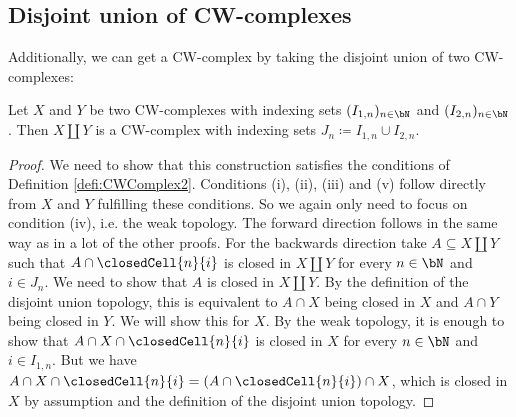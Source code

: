 \subsection{Disjoint union of CW-complexes}

Additionally, we can get a CW-complex by taking the disjoint union of two CW-complexes: 

\begin{lem}
    Let $X$ and $Y$ be two CW-complexes with indexing sets $(I_{1,n})_{n \in \bN}$ and $(I_{2, n})_{n \in \bN}$. 
    Then $X \amalg Y$ is a CW-complex with indexing sets $J_n \coloneq I_{1, n} \cup I_{2, n}$. \href{https://github.com/scholzhannah/CWComplexes/blob/7be4872a05b534011cc969eb5b80a4b7f0bf57e2/CWcomplexes/Constructions.lean#L71-L136}{\faExternalLink}
\end{lem}
\begin{proof}
    We need to show that this construction satisfies the conditions of Definition \ref{defi:CWComplex2}. 
    Conditions (i), (ii), (iii) and (v) follow directly from $X$ and $Y$ fulfilling these conditions. 
    So we again only need to focus on condition (iv), i.e. the weak topology. 
    The forward direction follows in the same way as in a lot of the other proofs.
    For the backwards direction take $A \subseteq X \amalg Y$ such that $A \cap \closedCell{n}{i}$ is closed in $X \amalg Y$ for every $n \in \bN$ and $i \in J_n$. 
    We need to show that $A$ is closed in $X \amalg Y$. 
    By the definition of the disjoint union topology, this is equivalent to $A \cap X$ being closed in $X$ and $A \cap Y$ being closed in $Y$. 
    We will show this for $X$. 
    By the weak topology, it is enough to show that $A \cap X \cap \closedCell{n}{i}$ is closed in $X$ for every $n \in \bN$ and $i \in I_{1, n}$. 
    But we have $A \cap X \cap \closedCell{n}{i} = (A \cap \closedCell{n}{i}) \cap X$, which is closed in $X$ by assumption and the definition of the disjoint union topology.
\end{proof}